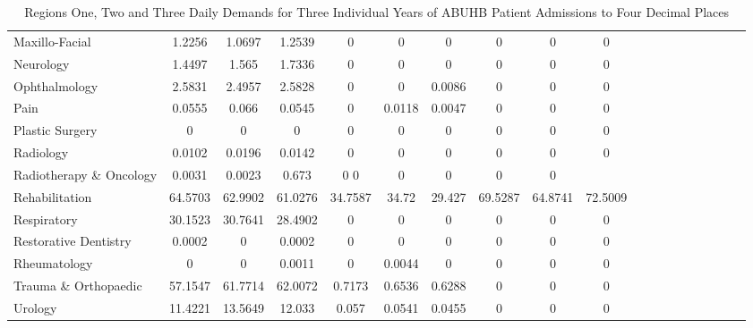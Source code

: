 \documentclass[../thesis.tex]{subfiles}
\begin{document}
\begin{landscape}
\begin{table}[h!]
{\begin{tabular}{lcccccccccccccccccc}
Maxillo-Facial&1.2256	&1.0697	&1.2539&	0	&0	&0	&0&	0	&0\\
Neurology&1.4497	&1.565	&1.7336&	0&	0	&0&	0	&0	&0	\\
Ophthalmology  &2.5831	&2.4957	&2.5828&	0&	0	&0.0086	&0	&0&	0\\
Pain &0.0555	&0.066	&0.0545&	0&	0.0118	&0.0047	&0&	0	&0\\
Plastic Surgery&0	&0	&0	&0	&0&	0&	0	&0	&0\\
Radiology&0.0102	&0.0196	&0.0142	&0&	0&	0	&0	&0&	0\\
 Radiotherapy \& Oncology&0.0031	&0.0023	&0.673	&0	0	&0	&0	&0	&0\\
Rehabilitation&64.5703&	62.9902	&61.0276	&34.7587&	34.72&	29.427	&69.5287&	64.8741&	72.5009	\\
Respiratory&30.1523	&30.7641&	28.4902&	0	&0	&0	&0	&0	&0\\
Restorative Dentistry&0.0002	&0	&0.0002&	0	&0	&0	&0	&0	&0\\
Rheumatology&0	&0&	0.0011&	0	&0.0044&0	&0	&0	&0\\
Trauma \& Orthopaedic&57.1547	&61.7714&	62.0072&	0.7173	&0.6536&	0.6288&	0&	0	&0\\
Urology&11.4221	&13.5649&	12.033&	0.057	&0.0541&	0.0455&	0&	0	&0\\ \bottomrule

    \end{tabular}}
    \caption{Regions One, Two and Three Daily Demands for Three Individual Years of ABUHB Patient Admissions to Four Decimal Places}
    \label{tab:regionaldemandsexp2a}
\end{table}

\begin{table}[h! ]
    \centering{}
\end{table}
\end{landscape}
\end{document}
